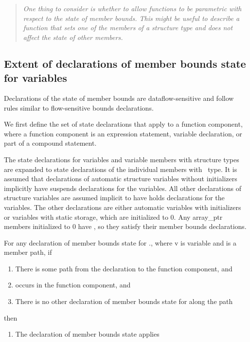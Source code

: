 \begin{quote}
\emph{One thing to consider is whether to allow functions to be
parametric with respect to the state of member bounds. This might be
useful to describe a function that sets one of the members of a
structure type and does not affect the state of other members.}
\end{quote}

\subsection{Extent of declarations of member bounds state for variables}
\label{section:member-bounds-state-extent}

Declarations of the state of member bounds are dataflow-sensitive and
follow rules similar to flow-sensitive bounds declarations.

We first define the set of state declarations that apply to a function
component, where a function component is an expression statement,
variable declaration, or part of a compound statement.

The state declarations for variables and variable members with structure
types are expanded to state declarations of the individual members with
\arrayptr\ type. It is assumed that declarations of automatic
structure variables without initializers implicitly have suspends
declarations for the variables. All other declarations of structure
variables are assumed implicit to have holds declarations for the
variables. The other declarations are either automatic variables with
initializers or variables with static storage, which are initialized to
0. Any array\_ptr members initialized to 0 have \boundsany, so
they satisfy their member bounds declarations.

For any declaration of member bounds state for ., where
v is variable and  is a member path, if

\begin{enumerate}
\item
  There is some path from the declaration to the function component, and
\item
   occurs in the function component, and
\item
  There is no other declaration of member bounds state for 
  along the path
\end{enumerate}

then

\begin{enumerate}
\item
  The declaration of member bounds state applies
\end{enumerate}

